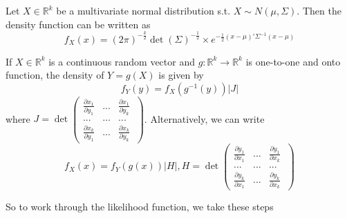 \begin{mdframed}[backgroundcolor=blue!5] 
\begin{lemma}
Let $X\in\mathbb{R}^k$ be a multivariate normal distribution s.t. $X\sim N(\mu, \Sigma)$. Then the density function can be written as
\[
f_X(x)=(2\pi)^{-\frac{k}{2}}\det(\Sigma)^{-\frac{1}{2}}\times e^{-\frac{1}{2}(x-\mu)'\Sigma^{-1}(x-\mu)}
\]
\end{lemma}
\begin{lemma}
If $X\in\mathbb{R}^k$ is a continuous random vector and $g:\mathbb{R}^k \to\mathbb{R}^k$ is one-to-one and onto function, the density of $Y=g(X)$ is given by
\[
f_Y(y) = f_X(g^{-1}(y))\left|J\right|
\]
where $J = \det\begin{pmatrix}\frac{\partial x_1}{\partial y_1} & ... & \frac{\partial x_1}{\partial y_k} \
\\ ... &... &...\\ \frac{\partial x_k}{\partial y_1} & ... &\frac{\partial x_k}{\partial y_k}\end{pmatrix}$. Alternatively, we can write
\[
f_X(x) = f_Y(g(x))|H|, H=\det\begin{pmatrix}\frac{\partial y_1}{\partial x_1} & ... & \frac{\partial y_1}{\partial x_k} \
\\ ... &... &...\\ \frac{\partial y_k}{\partial x_1} & ... &\frac{\partial y_k}{\partial x_k}\end{pmatrix}
\]
\end{lemma}
\end{mdframed}
So to work through the likelihood function, we take these steps
